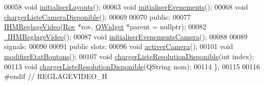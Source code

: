 \begin{DoxyCode}
00058     \textcolor{keywordtype}{void} \hyperlink{class_i_h_m_reglage_video_a6efcf5e8c7dfd272ecb1398985f7332a}{initialiserLayouts}();
00063     \textcolor{keywordtype}{void} \hyperlink{class_i_h_m_reglage_video_a4576b1b6ccfcabf6b2b39d37db2dd248}{initialiserEvenements}();    
00068     \textcolor{keywordtype}{void} \hyperlink{class_i_h_m_reglage_video_a0a480faa747bc705b4cf49df4ecc1d44}{chargerListeCameraDisponible}();
00069 
00070 \textcolor{keyword}{public}:
00077     \hyperlink{class_i_h_m_reglage_video_aa057ded6ad29a2d7fd117a8e9336c3ad}{IHMReglageVideo}(\hyperlink{class_rov}{Rov} *rov, \hyperlink{class_q_widget}{QWidget} *parent = \textcolor{keyword}{nullptr});
00082     \hyperlink{class_i_h_m_reglage_video_aaf105e0ca892a751632170a3a083dfec}{~IHMReglageVideo}();
00087     \textcolor{keywordtype}{void} \hyperlink{class_i_h_m_reglage_video_aba318ba2789177dafcf2651f95603435}{initialiserEvenementsCamera}();
00088 
00089 signals:
00090 
00091 \textcolor{keyword}{public} slots:
00096     \textcolor{keywordtype}{void} \hyperlink{class_i_h_m_reglage_video_a7e5c5d7515a6c745dfde5c3ad3b61a66}{activerCamera}();
00101     \textcolor{keywordtype}{void} \hyperlink{class_i_h_m_reglage_video_ac838581ba03f52e79064cb91ebabb35d}{modifierEtatBoutons}();
00107     \textcolor{keywordtype}{void} \hyperlink{class_i_h_m_reglage_video_a26dc15cf9453af24c464f0d6aebb42df}{chargerListeResolutionDisponible}(\textcolor{keywordtype}{int} index);
00113     \textcolor{keywordtype}{void} \hyperlink{class_i_h_m_reglage_video_a26dc15cf9453af24c464f0d6aebb42df}{chargerListeResolutionDisponible}(QString nom);
00114 \};
00115 
00116 \textcolor{preprocessor}{#endif // REGLAGEVIDEO\_H}
\end{DoxyCode}
